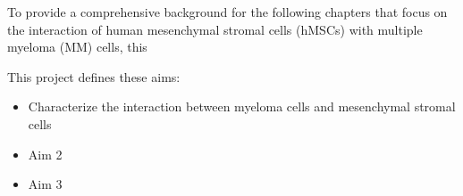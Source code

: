 \documentclass[12pt]{doctoral_thesis_uniwue}
\begin{document}
To provide a comprehensive background for the following chapters that focus on
the interaction of human mesenchymal stromal cells (hMSCs) with multiple myeloma
(MM) cells, this






\newpage


This project defines these aims:


\begin{itemize}
    \item Characterize the interaction between myeloma cells and mesenchymal stromal cells
    \item Aim 2
    \item Aim 3

\end{itemize}

\newpage




\newpage


\newpage





\newpage


\renewcommand{\refname}{} %
\vspace{-2\vdouble} %


\pagestyle{headersfooters} %
\end{document}
